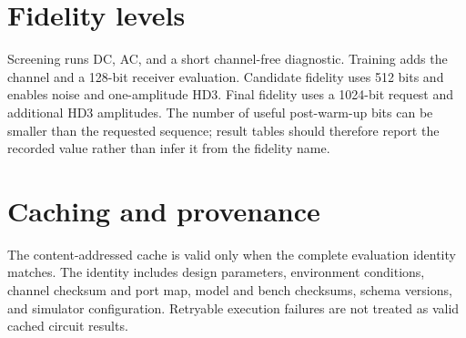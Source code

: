 \section{Fidelity levels}

Screening runs DC, AC, and a short channel-free diagnostic. Training adds the
channel and a 128-bit receiver evaluation. Candidate fidelity uses 512 bits and
enables noise and one-amplitude HD3. Final fidelity uses a 1024-bit request and
additional HD3 amplitudes. The number of useful post-warm-up bits can be smaller
than the requested sequence; result tables should therefore report the recorded
 value rather than infer it from the fidelity name.

\section{Caching and provenance}

The content-addressed cache is valid only when the complete evaluation identity
matches. The identity includes design parameters, environment conditions,
channel checksum and port map, model and bench checksums, schema versions, and
simulator configuration. Retryable execution failures are not treated as valid
cached circuit results.
